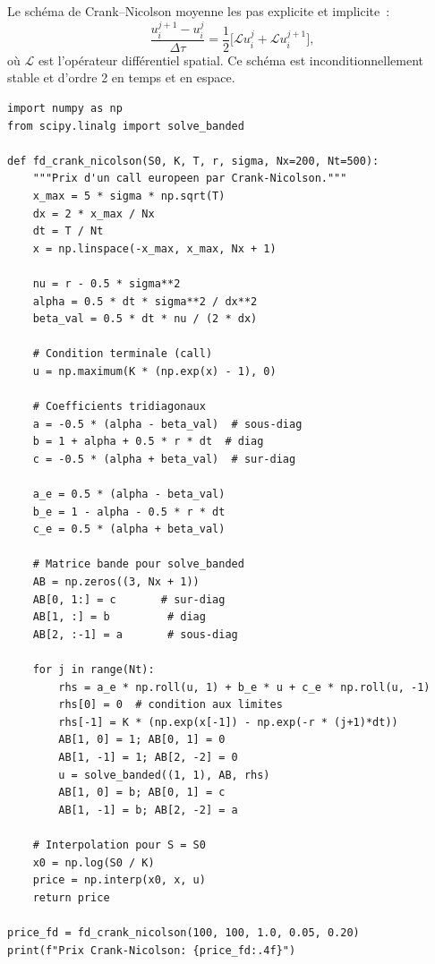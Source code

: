 \begin{definition}
Le sch\'ema de Crank--Nicolson moyenne les pas explicite et implicite~:
\[
    \frac{u_i^{j+1} - u_i^j}{\Delta\tau}
    = \frac{1}{2}\bigl[\mathcal{L}u_i^j + \mathcal{L}u_i^{j+1}\bigr],
\]
o\`u $\mathcal{L}$ est l'op\'erateur diff\'erentiel spatial. Ce sch\'ema
est inconditionnellement stable et d'ordre 2 en temps et en espace.
\end{definition}

\begin{codeblock}[title=\textbf{Diff\'erences finies --- Crank--Nicolson}]
\begin{verbatim}
import numpy as np
from scipy.linalg import solve_banded

def fd_crank_nicolson(S0, K, T, r, sigma, Nx=200, Nt=500):
    """Prix d'un call europeen par Crank-Nicolson."""
    x_max = 5 * sigma * np.sqrt(T)
    dx = 2 * x_max / Nx
    dt = T / Nt
    x = np.linspace(-x_max, x_max, Nx + 1)

    nu = r - 0.5 * sigma**2
    alpha = 0.5 * dt * sigma**2 / dx**2
    beta_val = 0.5 * dt * nu / (2 * dx)

    # Condition terminale (call)
    u = np.maximum(K * (np.exp(x) - 1), 0)

    # Coefficients tridiagonaux
    a = -0.5 * (alpha - beta_val)  # sous-diag
    b = 1 + alpha + 0.5 * r * dt  # diag
    c = -0.5 * (alpha + beta_val)  # sur-diag

    a_e = 0.5 * (alpha - beta_val)
    b_e = 1 - alpha - 0.5 * r * dt
    c_e = 0.5 * (alpha + beta_val)

    # Matrice bande pour solve_banded
    AB = np.zeros((3, Nx + 1))
    AB[0, 1:] = c       # sur-diag
    AB[1, :] = b         # diag
    AB[2, :-1] = a       # sous-diag

    for j in range(Nt):
        rhs = a_e * np.roll(u, 1) + b_e * u + c_e * np.roll(u, -1)
        rhs[0] = 0  # condition aux limites
        rhs[-1] = K * (np.exp(x[-1]) - np.exp(-r * (j+1)*dt))
        AB[1, 0] = 1; AB[0, 1] = 0
        AB[1, -1] = 1; AB[2, -2] = 0
        u = solve_banded((1, 1), AB, rhs)
        AB[1, 0] = b; AB[0, 1] = c
        AB[1, -1] = b; AB[2, -2] = a

    # Interpolation pour S = S0
    x0 = np.log(S0 / K)
    price = np.interp(x0, x, u)
    return price

price_fd = fd_crank_nicolson(100, 100, 1.0, 0.05, 0.20)
print(f"Prix Crank-Nicolson: {price_fd:.4f}")
\end{verbatim}
\end{codeblock}

